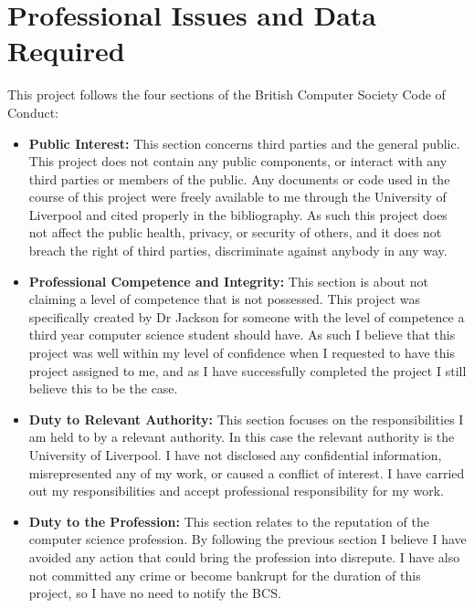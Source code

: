 \documentclass{article}
\begin{document}
    \section{Professional Issues and Data Required}
    
    	This project follows the four sections of the British Computer Society Code of Conduct:
    	
    	\begin{itemize}
    		\item \textbf{Public Interest:} This section concerns third parties and the general public. This project does not contain any public components, or interact with any third parties or members of the public. Any documents or code used in the course of this project were freely available to me through the University of Liverpool and cited properly in the bibliography. As such this project does not affect  the public health, privacy, or security of others, and it does not breach the right of third parties, discriminate against anybody in any way.
    		
    		\item \textbf{Professional Competence and Integrity:} This section is about not claiming a level of competence that is not possessed. This project was specifically created by Dr Jackson for someone with the level of competence a third year computer science student should have. As such I believe that this project was well within my level of confidence when I requested to have this project assigned to me, and as I have successfully completed the project I still believe this to be the case.
    		
    		\item \textbf{Duty to Relevant Authority:} This section focuses on the responsibilities I am held to by a relevant authority. In this case the relevant authority is the University of Liverpool. I have not disclosed any confidential information, misrepresented any of my work, or caused a conflict of interest. I have carried out my responsibilities and accept professional responsibility for my work.
    		
    		\item \textbf{Duty to the Profession:} This section relates to the reputation of the computer science profession. By following the previous section I believe I have avoided any action that could bring the profession into disrepute. I have also not committed any crime or become bankrupt for the duration of this project, so I have no need to notify the BCS.
    	\end{itemize}
    
\end{document}
